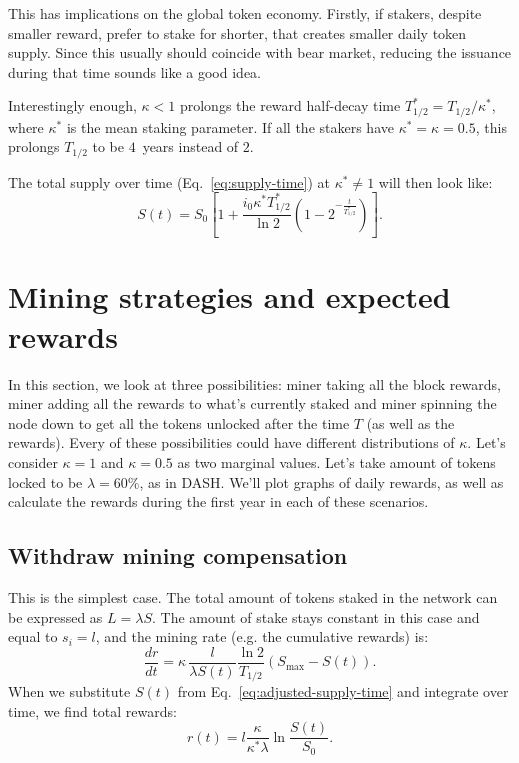 \documentclass[longbibliography,nofootinbib,twocolumn]{revtex4-1}
\begin{document}
This has implications on the global token economy.
Firstly, if stakers, despite smaller reward, prefer to stake for shorter, that creates smaller daily token supply.
Since this usually should coincide with bear market, reducing the issuance during that time sounds like a good idea.

Interestingly enough, $\kappa < 1$ prolongs the reward half-decay time $T_{1/2}^* = T_{1/2} / \kappa^*$, where $\kappa^*$ is the mean staking parameter.
If all the stakers have $\kappa^* = \kappa = 0.5$, this prolongs $T_{1/2}$ to be $4$~years instead of $2$.

The total supply over time (Eq.~\ref{eq:supply-time}) at $\kappa^* \ne 1$ will then look like:
\begin{equation}
    \label{eq:adjusted-supply-time}
    S(t) = S_0 \left[1 + \frac{i_0 \kappa^* T_{1/2}^*}{\ln{2}}\left(1 - 2^{-\frac{t}{T_{1/2}^*}} \right) \right].
\end{equation}

\section{Mining strategies and expected rewards}

In this section, we look at three possibilities: miner taking all the block rewards, miner adding all the rewards to what's currently staked and miner spinning
the node down to get all the tokens unlocked after the time $T$ (as well as the rewards).
Every of these possibilities could have different distributions of $\kappa$.
Let's consider $\kappa=1$ and $\kappa=0.5$ as two marginal values.
Let's take amount of tokens locked to be $\lambda=60\%$, as in DASH.
We'll plot graphs of daily rewards, as well as calculate the rewards during the first year in each of these scenarios.

\subsection{Withdraw mining compensation}

This is the simplest case.
The total amount of tokens staked in the network can be expressed as $L=\lambda S$.
The amount of stake stays constant in this case and equal to $s_i = l$, and the mining rate (e.g. the cumulative rewards) is:
\begin{equation}
    \frac{dr}{dt} =  \kappa\, \frac{l}{\lambda S(t)} \frac{\ln{2}}{T_{1/2}} \left( S_{\max} - S(t)\right).
\end{equation}
When we substitute $S(t)$ from Eq.~\ref{eq:adjusted-supply-time} and integrate over time, we find total rewards:
\begin{equation}
    r(t) = l \frac{\kappa}{\kappa^* \lambda} \ln\frac{S(t)}{S_0}.
\end{equation}
\end{document}
